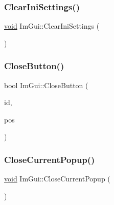 \mbox{\label{namespaceImGui_a845668cf582865444dd93809f6878d49}} 
\subsubsection{\texorpdfstring{Clear\+Ini\+Settings()}{ClearIniSettings()}}
{\footnotesize\ttfamily \hyperlink{imgui__impl__opengl3__loader_8h_ac668e7cffd9e2e9cfee428b9b2f34fa7}{void} Im\+Gui\+::\+Clear\+Ini\+Settings (\begin{DoxyParamCaption}{ }\end{DoxyParamCaption})}

\mbox{\label{namespaceImGui_a4f6da873474094ce131edd2dcda98551}} 
\subsubsection{\texorpdfstring{Close\+Button()}{CloseButton()}}
{\footnotesize\ttfamily bool Im\+Gui\+::\+Close\+Button (\begin{DoxyParamCaption}\item[{Im\+Gui\+ID}]{id,  }\item[{const \hyperlink{structImVec2}{Im\+Vec2} \&}]{pos }\end{DoxyParamCaption})}

\mbox{\label{namespaceImGui_aeaec6479834db7918260fc082107f90b}} 
\subsubsection{\texorpdfstring{Close\+Current\+Popup()}{CloseCurrentPopup()}}
{\footnotesize\ttfamily \hyperlink{imgui__impl__opengl3__loader_8h_ac668e7cffd9e2e9cfee428b9b2f34fa7}{void} Im\+Gui\+::\+Close\+Current\+Popup (\begin{DoxyParamCaption}{ }\end{DoxyParamCaption})}

\mbox{\label{namespaceImGui_a6321db9d0281af83216ec69f777f63bd}} 
